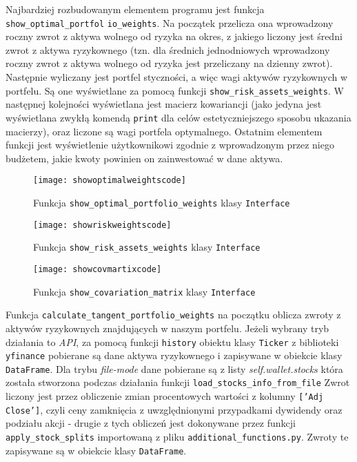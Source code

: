 \documentclass[magister]{dyplom}
\def\code#1{\texttt{#1}}
\begin{document}
Najbardziej rozbudowanym elementem programu jest funkcja \code{show\_optimal\_portfol} \code{io\_weights}. Na początek przelicza ona wprowadzony roczny zwrot z aktywa wolnego od ryzyka na okres, z jakiego liczony jest średni zwrot z aktywa ryzykownego (tzn. dla średnich jednodniowych wprowadzony roczny zwrot z aktywa wolnego od ryzyka jest przeliczany na dzienny zwrot). Następnie wyliczany jest portfel styczności, a więc wagi aktywów ryzykownych w portfelu. Są one wyświetlane za pomocą funkcji \code{show\_risk\_assets\_weights}. W następnej kolejności wyświetlana jest macierz kowariancji (jako jedyna jest wyświetlana zwykłą komendą \code{print} dla celów estetyczniejszego sposobu ukazania macierzy), oraz liczone są wagi portfela optymalnego. Ostatnim elementem funkcji jest wyświetlenie użytkownikowi zgodnie z wprowadzonym przez niego budżetem, jakie kwoty powinien on zainwestować w dane aktywa.

\begin{figure}[ht]
	\centering
	\texttt{[image: showoptimalweightscode]}
	\caption{Funkcja \code{show\_optimal\_portfolio\_weights} klasy \code{Interface}}
\end{figure}

\begin{figure}[h]
	\centering
	\texttt{[image: showriskweightscode]}
	\caption{Funkcja \code{show\_risk\_assets\_weights} klasy \code{Interface}}
\end{figure}

\begin{figure}[h]
	\centering
	\texttt{[image: showcovmartixcode]}
	\caption{Funkcja \code{show\_covariation\_matrix} klasy \code{Interface}}
\end{figure}
\newpage
Funkcja \code{calculate\_tangent\_portfolio\_weights} na początku oblicza zwroty z aktywów ryzykownych znajdujących w naszym portfelu. Jeżeli wybrany tryb działania to \textit{API}, za pomocą funkcji \code{history} obiektu klasy \code{Ticker} z biblioteki \code{yfinance} pobierane są dane aktywa ryzykownego i zapisywane w obiekcie klasy \code{DataFrame}. Dla trybu \textit{file-mode} dane pobierane są z listy \textit{self.wallet.stocks} która została stworzona podczas działania funkcji \code{load\_stocks\_info\_from\_file}  Zwrot liczony jest przez obliczenie zmian procentowych wartości z kolumny \code{['Adj Close']}, czyli ceny zamknięcia z uwzględnionymi przypadkami dywidendy oraz podziału akcji - drugie z tych obliczeń jest dokonywane przez funkcji \code{apply\_stock\_splits} importowaną z pliku \code{additional\_functions.py}. Zwroty te zapisywane są w obiekcie klasy \code{DataFrame}.
\end{document}
